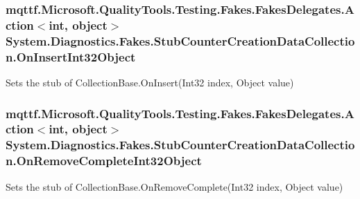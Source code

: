 \hypertarget{class_system_1_1_diagnostics_1_1_fakes_1_1_stub_counter_creation_data_collection_a16c3ca000bf4b287d42eb5e7a52a1ffb}{
\subsubsection[{On\-Insert\-Int32\-Object}]{\setlength{\rightskip}{0pt plus 5cm}mqttf.\-Microsoft.\-Quality\-Tools.\-Testing.\-Fakes.\-Fakes\-Delegates.\-Action$<$int, object$>$ System.\-Diagnostics.\-Fakes.\-Stub\-Counter\-Creation\-Data\-Collection.\-On\-Insert\-Int32\-Object}}\label{class_system_1_1_diagnostics_1_1_fakes_1_1_stub_counter_creation_data_collection_a16c3ca000bf4b287d42eb5e7a52a1ffb}


Sets the stub of Collection\-Base.\-On\-Insert(\-Int32 index, Object value)

\hypertarget{class_system_1_1_diagnostics_1_1_fakes_1_1_stub_counter_creation_data_collection_a05aba58b4425f72aa68e2664128489bd}{
\subsubsection[{On\-Remove\-Complete\-Int32\-Object}]{\setlength{\rightskip}{0pt plus 5cm}mqttf.\-Microsoft.\-Quality\-Tools.\-Testing.\-Fakes.\-Fakes\-Delegates.\-Action$<$int, object$>$ System.\-Diagnostics.\-Fakes.\-Stub\-Counter\-Creation\-Data\-Collection.\-On\-Remove\-Complete\-Int32\-Object}}\label{class_system_1_1_diagnostics_1_1_fakes_1_1_stub_counter_creation_data_collection_a05aba58b4425f72aa68e2664128489bd}


Sets the stub of Collection\-Base.\-On\-Remove\-Complete(\-Int32 index, Object value)

